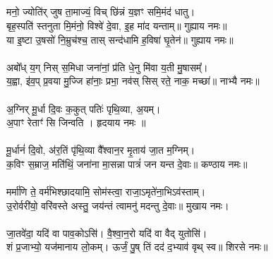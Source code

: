 \subsection{}
मनो॒ ज्योति॑र् जुष ता॒माज्यं॒ विच् छि॑न्नं य॒ज्ञꣳ समि॒मंद॑ धातु। \\
बृह॒स्पति॑ स्तनुता मि॒मंनो॒ विश्वे॑ दे॒वा, इ॒ह मा॑द यन्ताम्॥ गुह्याय नमः॥\\
{\small या इ॒ष्टा उ॒षसो॑ नि॒म्रुच॑श्च॒ तास् सन्द॑धामि ह॒विषा॑ घृ॒तेन॑॥ गुह्याय नमः॥}\\
\\
अबो᳚ध् य॒ग् निस् स॒मिधा जना॑नां॒ प्र॑ति धे॒नु मि॑वा य॒ती मु॒षासम्᳚। \\
य॒ह्वा, इ॑व॒प् प्र॒वया मु॒ज्जि हा॑नाः॒ प्रभा॒ नव॑स् सिस् रते॒ नाक॒ मच्छा॑॥ नाभ्यै नमः॥\\
\\
अ॒ग्निर् मू॒र्धा दि॒वः क॒कुत् पतिः॑ पृथि॒व्या, अ॒यम्। \\
अ॒पाꣳ रेताꣳ॑ सि जिन्वति । हृदयाय नमः ॥\\
\\
मू॒र्धानं॑ दि॒वो, अ॑र॒तिं पृ॑थि॒व्या वै᳚श्वान॒र मृ॒ताय॑ जा॒त म॒ग्निम्‌। \\
क॒विꣳ स॒म्राज॒ मति॑थिं॒ जना॑ना मा॒सन्ना पात्रं॑ जन यन्त दे॒वाः॥ कण्ठाय नमः॥ \\
\\
मर्मा॑णि ते॒ वर्म॑भिश्छादयामि॒ सोम॑स्त्वा॒ राजा॒ऽमृते॑ना॒भिऽव॑स्ताम्।\\
उ॒रोर्वरी॑यो॒ वरि॑वस्ते अस्तु॒ जय॑न्तं त्वामनु॑ मदन्तु दे॒वाः॥ मुखाय नमः।\\
\\
जा॒तवे॑दा॒ यदि॑ वा पाव॒कोऽसि॑। वै॒श्वा॒न॒रो यदि॑ वा वैद् युतोसि॑। \\
शं प्र॒जाभ्यो॒ यज॑मानाय लो॒कम्। ऊर्जं॒ पु॒ष् तिं दद॑ द॒भ्याव॑ वृथ् स्व॥ शिरसे नमः॥\\
